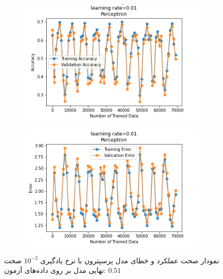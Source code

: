 \documentclass[12pt, a4paper]{article}
\begin{document}
\begin{figure}[h]
    \begin{subfigure}{0.45\linewidth}
        \centering
        \includegraphics[width=\linewidth]{images/5/perceptron/lr/acc_0.01.png}
    \end{subfigure}
    \hfil
    \begin{subfigure}{0.45\linewidth}
        \centering
        \includegraphics[width=\linewidth]{images/5/perceptron/lr/error_0.01.png}
    \end{subfigure}
    \caption{نمودار صحت عملکرد‌ و خطای مدل پرسپترون با نرخ یادگیری $10^{-2}$
    \newline
    صحت نهایی مدل بر روی داده‌های آزمون: $0.51$}
\end{figure}
\end{document}
